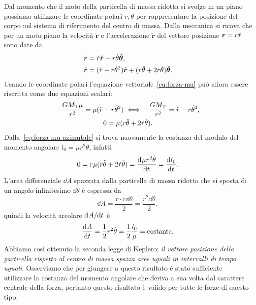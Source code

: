 Dal momento che il moto della particella di massa ridotta si svolge in un piano
possiamo utilizzare le coordinate polari $r,\theta$ per rappresentare la
posizione del corpo nel sistema di riferimento del centro di massa. Dalla
meccanica si ricava che per un moto piano la velocità $\dot{\bm{r}}$ e
l'accelerazione $\ddot{\bm{r}}$ del vettore posizione $\bm{r}=r\hat{\bm{r}}$ sono
date da
\begin{subequations}
  \begin{align}
    \dot{\bm{r}}  &= \dot{r}\hat{\bm{r}} +
    r\dot{\theta}\hat{\bm{\theta}}, \label{eq:velocita-polare}\\
    \ddot{\bm{r}} &= (\ddot{r}-r\dot{\theta}^2)\hat{\bm{r}} + (r\ddot{\theta} +
    2\dot{r}\dot{\theta}) \hat{\bm{\theta}}.
  \end{align}
\end{subequations}
Usando le coordinate polari l'equazione vettoriale~\eqref{eq:forza-mu} può
allora essere riscritta come due equazioni scalari:
\begin{subequations}
  \begin{gather}
    -\frac{GM_\textup{T}\mu}{r^2} = \mu(\ddot{r} - r\dot{\theta}^2) \iff
    -\frac{GM_\textup{T}}{r^2}=\ddot{r}-r\dot{\theta}^2,
    \label{eq:forza-mu-radiale}\\
    0 = \mu(r\ddot{\theta} +
    2\dot{r}\dot{\theta}). \label{eq:forza-mu-azimutale}
  \end{gather}
\end{subequations}
Dalla~\eqref{eq:forza-mu-azimutale} si trova nuovamente la costanza del modulo del
momento angolare $l_0 = \mu r^2\dot{\theta}$, infatti
\begin{equation}
  0 = r\mu(r\ddot{\theta} + 2\dot{r}\dot{\theta}) = \frac{{\mathop{}\!\mathrm{d}^{}}\mu
    r^2\dot{\theta}}{\mathop{}\!\mathrm{d} {t}^{}} = \frac{{\mathop{}\!\mathrm{d}^{}}l_0}{\mathop{}\!\mathrm{d} {t}^{}}.
\end{equation}
L'area differenziale $\dd A$ spazzata dalla particella di massa ridotta che si
sposta di un angolo infinitesimo $\dd\theta$ è espressa da
\begin{equation}
  \dd A = \frac{r\cdot r\dd\theta}{2} = \frac{r^2\dd\theta}{2},
\end{equation}
quindi la velocità areolare $\mathrm{d}^{}A / \mathrm{d} {t}^{}$ è
\begin{equation}
  \frac{{\mathop{}\!\mathrm{d}^{}}A}{\mathop{}\!\mathrm{d} {t}^{}} = \frac{1}{2}r^2\dot{\theta} = \frac{1}{2}\frac{l_0}{\mu} =
  \text{costante}.
\end{equation}
Abbiamo così ottenuto la seconda legge di Keplero: \emph{il vettore posizione
  della particella rispetto al centro di massa spazza aree uguali in intervalli
  di tempo uguali}. Osserviamo che per giungere a questo risultato è stato
sufficiente utilizzare la costanza del momento angolare che deriva a sua volta
dal carattere centrale della forza, pertanto questo risultato è valido per tutte
le forze di questo tipo.


